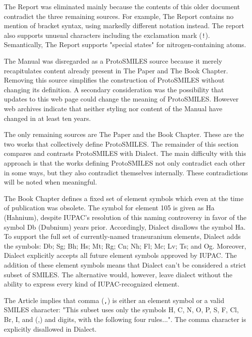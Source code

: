 \documentclass{article}
\def\ttt{\texttt}
\begin{document}
The Report was eliminated mainly because the contents of this older document contradict the three remaining sources. For example, The Report contains no mention of bracket syntax, using markedly different notation instead. The report also supports unusual characters including the exclamation mark (\ttt{!}). Semantically, The Report supports "special states" for nitrogen-containing atoms.

The Manual was disregarded as a ProtoSMILES source because it merely recapitulates content already present in The Paper and The Book Chapter. Removing this source simplifies the construction of ProtoSMILES without changing its definition. A secondary consideration was the possibility that updates to this web page could change the meaning of ProtoSMILES. However web archives indicate that neither styling nor content of the Manual have changed in at least ten years.

The only remaining sources are The Paper and the Book Chapter. These are the two works that collectively define ProtoSMILES. The remainder of this section compares and contrasts ProtoSMILES with Dialect. The main difficulty with this approach is that the works defining ProtoSMILES not only contradict each other in some ways, but they also contradict themselves internally. These contradictions will be noted when meaningful.

The Book Chapter defines a fixed set of element symbols which even at the time of publication was obsolete.\cite[p. 83]{weininger:2008} The symbol for element 105 is given as Ha (Hahnium), despite IUPAC's resolution of this naming controversy in favor of the symbol Db (Dubnium) years prior.\cite{sageson:1997} Accordingly, Dialect disallows the symbol Ha. To support the full set of currently-named transuranium elements, Dialect adds the symbols: Db; Sg; Bh; Hs; Mt; Rg; Cn; Nh; Fl; Mc; Lv; Ts; and Og. Moreover, Dialect explicitly accepts all future element symbols approved by IUPAC. The addition of these element symbols means that Dialect can't be considered a strict subset of SMILES. The alternative would, however, leave dialect without the ability to express every kind of IUPAC-recognized element.

The Article implies that comma (\ttt{,}) is either an element symbol or a valid SMILES character: "This subset uses only the symbols H, C, N, O, P, S, F, Cl, Br, I, and (,) and digits, with the following four rules...".\cite[p. 33]{weininger:1988} The comma character is explicitly disallowed in Dialect.
\end{document}
